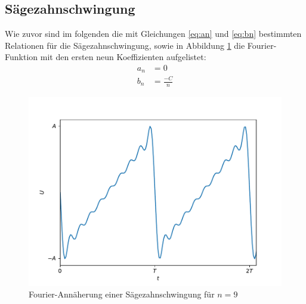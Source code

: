 \subsection{Sägezahnschwingung}
Wie zuvor sind im folgenden die mit Gleichungen \eqref{eq:an} und \eqref{eq:bn} bestimmten Relationen für die Sägezahnschwingung, sowie in Abbildung \ref{fig:vorbereitung_sägezahn} die Fourier-Funktion mit den ersten neun Koeffizienten aufgelistet:
\begin{align*}
    a_n &= 0 \\
    b_n &= \frac{-C}{n}
\end{align*}
\begin{figure}[h]
  \centering
  \includegraphics[width=\textwidth]{assets/fourier_zahn.pdf}
  \caption{Fourier-Annäherung einer Sägezahnschwingung für $n=9$}
  \label{fig:vorbereitung_sägezahn}
\end{figure}
